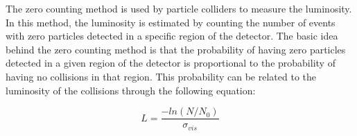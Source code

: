 \begin{itemize}
The zero counting method is used by particle colliders to measure the luminosity. In this method, the luminosity is estimated by counting the number of events with zero particles detected in a specific region of the detector. The basic idea behind the zero counting method is that the probability of having zero particles detected in a given region of the detector is proportional to the probability of having no collisions in that region. This probability can be related to the luminosity of the collisions through the following equation:

\begin{equation}
L = \frac{-ln(N/N_0)}{\sigma_{vis}}
\end{equation}


\end{itemize}
